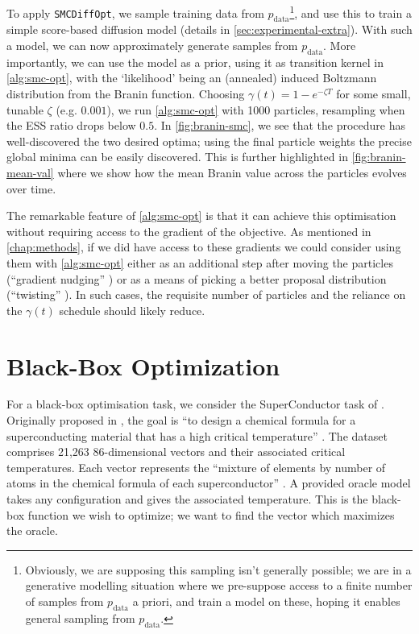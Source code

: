To apply \texttt{SMCDiffOpt}, we sample training data from $p_{\text{data}}$\footnote{Obviously, we
are supposing this sampling isn't generally possible; we are in a generative modelling situation
where we pre-suppose access to a finite number of samples from $p_{\text{data}}$ a priori, and
train a model on these, hoping it enables general sampling from $p_{\text{data}}$.}, and use this
to train a simple score-based diffusion model (details in \autoref{sec:experimental-extra}). With such
a model, we can now approximately generate samples from $p_{\text{data}}$. More importantly, we can
use the model as a prior, using it as transition kernel in \autoref{alg:smc-opt}, with the `likelihood'
being an (annealed) induced Boltzmann distribution from the Branin function. Choosing
$\gamma(t) = 1 - e^{-\zeta T}$ for some small, tunable $\zeta$ (e.g. $0.001$), we run
\autoref{alg:smc-opt} with 1000 particles, resampling when the ESS ratio drops below $0.5$. In
\autoref{fig:branin-smc}, we see that the procedure has well-discovered the two desired optima;
using the final particle weights the precise global minima can be easily discovered. This is further
highlighted in \autoref{fig:branin-mean-val} where we show how the mean Branin value across the
particles evolves over time.

The remarkable feature of \autoref{alg:smc-opt} is that it can achieve this optimisation without
requiring access to the gradient of the objective. As mentioned in \autoref{chap:methods}, if we did
have access to these gradients we could consider using them with \autoref{alg:smc-opt} either as an
additional step after moving the particles
(``gradient nudging'' \parencite{akyildizNudgingParticleFilter2020}) or as a means of picking a
better proposal distribution (``twisting'' \parencite{wuPracticalAsymptoticallyExact2023}). In
such cases, the requisite number of particles and the reliance on the $\gamma(t)$ schedule should
likely reduce.

\section{Black-Box Optimization} \label{sec:superconductor}

For a black-box optimisation task, we consider the SuperConductor task of
\textcite{trabuccoDesignBenchBenchmarksDataDriven2022}. Originally proposed in
\textcite{HAMIDIEH2018346}, the goal is ``to design a chemical formula for a superconducting
material that has a high critical temperature'' \parencite{trabuccoDesignBenchBenchmarksDataDriven2022}.
The dataset comprises 21,263 86-dimensional vectors and their associated critical temperatures. Each
vector represents the ``mixture of elements by number of atoms in the chemical
formula of each superconductor'' \parencite{trabuccoDesignBenchBenchmarksDataDriven2022}. A provided
oracle model takes any configuration and gives the associated temperature. This is the black-box
function we wish to optimize; we want to find the vector which maximizes the oracle.

